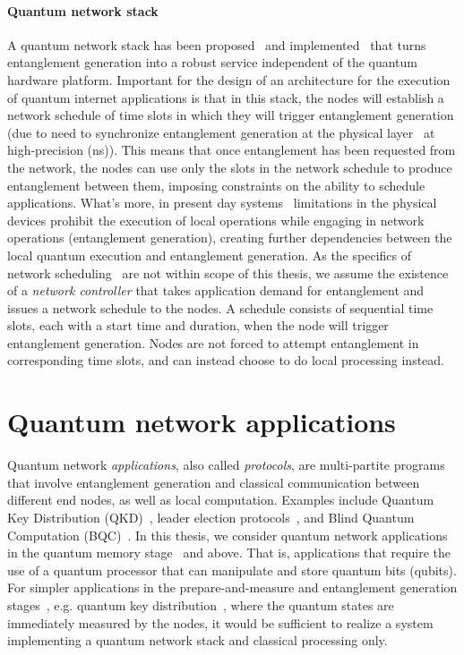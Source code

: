 \paragraph{Quantum network stack}
A quantum network stack has been proposed~\cite{dahlberg2019link} and implemented~\cite{pompili2022experimental} that turns entanglement generation into a robust service independent of the quantum hardware platform.
Important for the design of an architecture for the execution of quantum internet applications is that in this stack, the nodes will establish a network schedule of time slots in which they will trigger entanglement generation (due to need to synchronize entanglement generation at the physical layer~\cite{dahlberg2019link} at high-precision (ns)).
This means that once entanglement has been requested from the network, the nodes can use only the slots in the network schedule to produce entanglement between them, imposing constraints on the ability to schedule applications. What's more, in present day systems~\cite{pompili2021realization, krutyanskiy2023entanglement} limitations in the physical devices prohibit the execution of local operations while engaging in network operations (entanglement generation), creating further dependencies between the local quantum execution and entanglement generation. 
As the specifics of network scheduling~\cite{network-scheduling, skrzypczyk2021architecture} are not within scope of this thesis,
we assume the existence of a \textit{network controller} that takes application demand for entanglement and issues a network schedule to the nodes. 
A schedule consists of sequential time slots, each with a start time and duration, when the node will trigger entanglement generation.
Nodes are not forced to attempt entanglement in corresponding time slots, and can instead choose to do local processing instead.



\section{Quantum network applications}
Quantum network \textit{applications}, also called \textit{protocols}, are multi-partite programs that involve entanglement generation and classical communication between different end nodes, as well as local computation.
Examples include Quantum Key Distribution (QKD)~\cite{bb84, ekert1991quantum}, leader election protocols~\cite{kobayashi2014simpler, ganz2009quantum}, and Blind Quantum Computation (BQC)~\cite{Wehner2018stages}.
In this thesis, we consider quantum network applications in the quantum memory stage~\cite{wehner_2018_stages} and above. That is, applications that require the use of a quantum processor that can manipulate and store quantum bits (qubits). For simpler applications in the prepare-and-measure and entanglement generation stages~\cite{wehner_2018_stages}, e.g. quantum key distribution~\cite{bb84Original,ekert_1991_e91}, where the quantum states are immediately measured by the nodes, it would be sufficient to realize a system implementing a quantum network stack and classical processing only.

